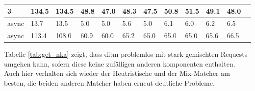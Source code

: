 \documentclass[12pt,a4paper]{report}
\begin{document}
\begin{table}[h]
\begin{tabular}{|l|l|l|l|l|l|l|l|l|l|l|l|}
		3                        & 134.5                              & 134.5                           & 48.8                        & 47.0                      & 48.3                           & 47.5   & 50.8 & 51.5   & 49.1 & 48.0   \\ \hline
		async                    & 13.7                               & 13.5                            & 5.0                         & 5.0                       & 5.6                            & 5.0    & 6.1  & 6.0    & 6.2  & 6.5    \\ \hline
		async                    & 113.4                              & 108.0                           & 60.9                        & 60.0                      & 65.2                           & 65.0   & 65.0 & 65.0   & 65.6 & 66.5   \\ \hline
	\end{tabular}
\end{table}

Tabelle \ref{tab:get_nka} zeigt, dass ditm problemlos mit stark gemischten Requests umgehen kann, sofern diese keine zufälligen
anderen komponenten enthalten. Auch hier verhalten sich wieder der Heutristische und der Mix-Matcher am besten, die beiden anderen
Matcher haben erneut deutliche Probleme.
\end{document}
